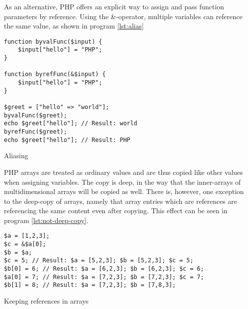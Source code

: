 As an alternative, PHP offers an explicit way to assign and pass function parameters by reference. Using the \&-operator, multiple variables can reference the same value, as shown in program \ref{lst:alias}

\begin{program}
\begin{lstlisting}
function byvalFunc($input) {
    $input["hello"] = "PHP";
}

function byrefFunc(&$input) {
    $input["hello"] = "PHP";
}

$greet = ["hello" => "world"];
byvalFunc($greet);
echo $greet["hello"]; // Result: world
byrefFunc($greet);
echo $greet["hello"]; // Result: PHP
\end{lstlisting}
\caption{Aliasing}
\label{lst:alias}
\end{program}

PHP arrays are treated as ordinary values and are thus copied like other values when assigning variables. The copy is deep, in the way that the inner-arrays of multidimensional arrays will be copied as well. There is, however, one exception to the deep-copy of arrays, namely that array entries which are references are referencing the same content even after copying. This effect can be seen in program \ref{lst:not-deep-copy}.

\begin{program}
\begin{lstlisting}
$a = [1,2,3];
$c = &$a[0];
$b = $a;
$c = 5; // Result: $a = [5,2,3]; $b = [5,2,3]; $c = 5;
$b[0] = 6; // Result: $a = [6,2,3]; $b = [6,2,3]; $c = 6;
$a[0] = 7; // Result: $a = [7,2,3]; $b = [7,2,3]; $c = 7;
$b[1] = 8; // Result: $a = [7,2,3]; $b = [7,8,3];
\end{lstlisting}
\caption{Keeping references in arrays}
\label{lst:not-deep-copy}
\end{program}